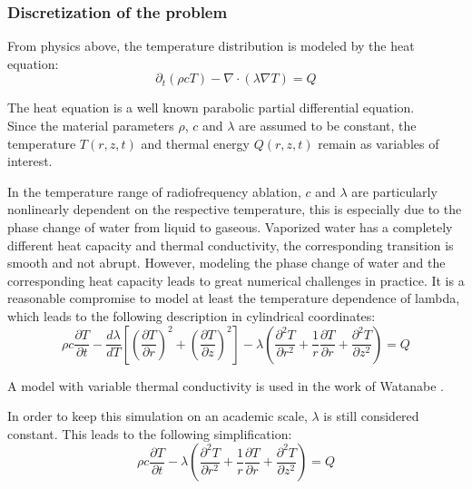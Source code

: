 \documentclass[parskip=half, titlepage=yes, 12pt, BCOR=12mm, DIV=calc]{scrartcl}
\begin{document}
\subsubsection{Discretization of the problem}

From physics above, the temperature distribution is modeled by the heat equation: 
\begin{equation}
    \partial_t (\rho c T) - \nabla \cdot (\lambda \nabla T) = Q
\end{equation}

The heat equation is a well known parabolic partial differential equation. \\

Since the material parameters $\rho$, $c$ and $\lambda$ are assumed to be constant, the temperature $T(r,z,t)$ and thermal energy $Q(r,z,t)$ remain as variables of interest.

In the temperature range of radiofrequency ablation, $c$ and $\lambda$ are particularly nonlinearly dependent on the respective temperature, this is especially due to the phase change of water from liquid to gaseous. Vaporized water has a completely different heat capacity and thermal conductivity, the corresponding transition is smooth and not abrupt. However, modeling the phase change of water and the corresponding heat capacity leads to great numerical challenges in practice. It is a reasonable compromise to model at least the temperature dependence of lambda, which leads to the following description in cylindrical coordinates:
\begin{equation}
    \rho c \frac{\partial T}{\partial t} -  \frac{d\lambda}{dT} \left[ \left( \frac{\partial T}{\partial r} \right)^2 + \left( \frac{\partial T}{\partial z} \right)^2 \right] - \lambda \left( \frac{\partial^2 T}{\partial r^2} + \frac{1}{r} \frac{\partial T}{\partial r} + \frac{\partial^2 T}{\partial z^2} \right) = Q
\end{equation}

A model with variable thermal conductivity is used in the work of Watanabe \cite{watanabe}.

In order to keep this simulation on an academic scale, $\lambda$ is still considered constant. This leads to the following simplification:
\begin{equation}
    \rho c \frac{\partial T}{\partial t} - \lambda \left( \frac{\partial^2 T}{\partial r^2} + \frac{1}{r} \frac{\partial T}{\partial r} + \frac{\partial^2 T}{\partial z^2} \right) = Q
\end{equation}
\end{document}
